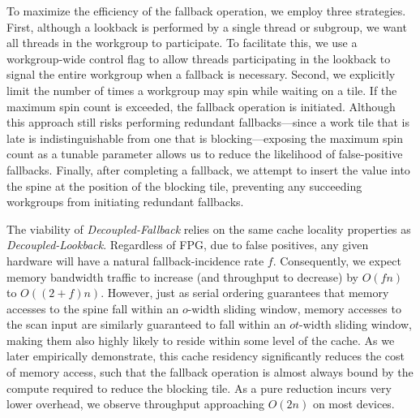 \documentclass[sigconf]{acmart}
\begin{document}
To maximize the efficiency of the fallback operation, we employ three strategies. First, although a lookback is performed by a single thread or subgroup, we want all threads in the workgroup to participate. To facilitate this, we use a workgroup-wide control flag to allow threads participating in the lookback to signal the entire workgroup when a fallback is necessary. Second, we explicitly limit the number of times a workgroup may spin while waiting on a tile. If the maximum spin count is exceeded, the fallback operation is initiated. Although this approach still risks performing redundant fallbacks---since a work tile that is late is indistinguishable from one that is blocking---exposing the maximum spin count as a tunable parameter allows us to reduce the likelihood of false-positive fallbacks. Finally, after completing a fallback, we attempt to insert the value into the spine at the position of the blocking tile, preventing any succeeding workgroups from initiating redundant fallbacks.

The viability of \emph{Decoupled-Fallback} relies on the same cache locality properties as \emph{Decoupled-Lookback}. Regardless of FPG, due to false positives, any given hardware will have a natural fallback-incidence rate $f$. Consequently, we expect memory bandwidth traffic to increase (and throughput to decrease) by $O(fn)$ to $O((2 + f)n)$. However, just as serial ordering guarantees that memory accesses to the spine fall within an $o$-width sliding window, memory accesses to the scan input are similarly guaranteed to fall within an $ot$-width sliding window, making them also highly likely to reside within some level of the cache. As we later empirically demonstrate, this cache residency significantly reduces the cost of memory access, such that the fallback operation is almost always bound by the compute required to reduce the blocking tile. As a pure reduction incurs very lower overhead, we observe throughput approaching $O(2n)$ on most devices.
\end{document}
